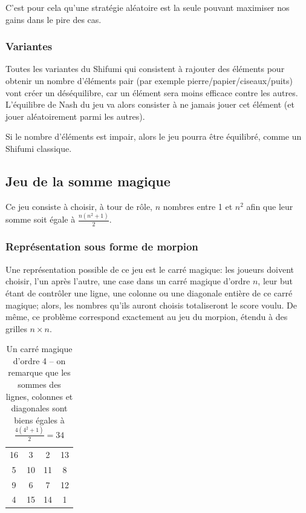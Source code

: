     C'est pour cela qu'une stratégie aléatoire est la seule pouvant maximiser
    nos gains dans le pire des cas.

  \subsubsection{Variantes}
    Toutes les variantes du Shifumi qui consistent à rajouter des éléments
    pour obtenir un nombre d'éléments pair (par exemple
    pierre/papier/ciseaux/puits) vont créer un déséquilibre, car un élément
    sera moins efficace contre les autres.
    L'équilibre de Nash du jeu va
    alors consister à ne jamais jouer cet élément (et jouer aléatoirement parmi
    les autres).

    Si le nombre d'éléments est impair, alors le jeu pourra être équilibré,
    comme un Shifumi classique.

\subsection{Jeu de la somme magique}
  Ce jeu consiste à choisir, à tour de rôle, $n$ nombres entre 1 et $n^2$ afin
  que leur somme soit égale à $\frac{n(n^2+1)}{2}$.

  \subsubsection{Représentation sous forme de morpion}
Une représentation possible de ce jeu est le carré magique: les
joueurs doivent choisir, l'un après l'autre, une case dans un carré
magique d'ordre $n$, leur but étant de contrôler une ligne, une colonne ou une
diagonale entière de ce carré magique; alors, les nombres qu'ils auront
choisis totaliseront le score voulu. De même, ce problème correspond exactement
au jeu du morpion, étendu à des grilles $n \times n$.

\begin{table}[h]
  \centering
  \begin{tabular}{|cccc|}
    \hline
    16 & 3  & 2  & 13 \\
    5  & 10 & 11 & 8  \\
    9  & 6  & 7  & 12 \\
    4  & 15 & 14 & 1  \\
    \hline
  \end{tabular}
  \caption{Un carré magique d'ordre 4 -- on remarque que les sommes des lignes,
    colonnes et diagonales sont biens égales à $\frac {4(4^2+1)} 2 = 34$}
\end{table}

